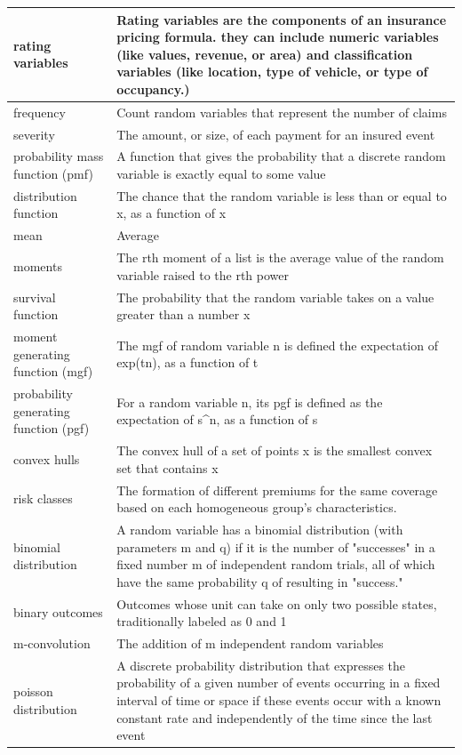 \documentclass[
]{book}
\begin{document}
\begin{longtable}{>{\raggedright\arraybackslash}p{10em}|>{\raggedright\arraybackslash}p{30em}}
\hline
rating variables & Rating variables are the components of an insurance pricing formula. they can include numeric variables (like values, revenue, or area) and classification variables (like location, type of vehicle, or type of occupancy.)\\
\hline
frequency & Count random variables that represent the number of claims\\
\hline
severity & The amount, or size, of each payment for an insured event\\
\hline
probability mass function (pmf) & A function that gives the probability that a discrete random variable is exactly equal to some value\\
\hline
distribution function & The chance that the random variable is less than or equal to x, as a function of x\\
\hline
mean & Average\\
\hline
moments & The rth moment of a list is the average value of the random variable raised to the rth power\\
\hline
survival function & The probability that the random variable takes on a value greater than a number x\\
\hline
moment generating function (mgf) & The mgf of random variable n is defined the expectation of exp(tn), as a function of t\\
\hline
probability generating function (pgf) & For a random variable n, its pgf is defined as the expectation of s\textasciicircum{}n, as a function of s\\
\hline
convex hulls & The convex hull of a set of points x is the smallest convex set that contains x\\
\hline
risk classes & The formation of different premiums for the same coverage based on each homogeneous group's characteristics.\\
\hline
binomial distribution & A random variable has a binomial distribution (with parameters m and q) if it is the number of "successes" in a fixed number m of independent random trials, all of which have the same probability q of resulting in "success."\\
\hline
binary outcomes & Outcomes whose unit can take on only two possible states, traditionally labeled as 0 and 1\\
\hline
m-convolution & The addition of m independent random variables\\
\hline
poisson distribution & A discrete probability distribution that expresses the probability of a given number of events occurring in a fixed interval of time or space if these events occur with a known constant rate and independently of the time since the last event\\

\end{longtable}
\end{document}
